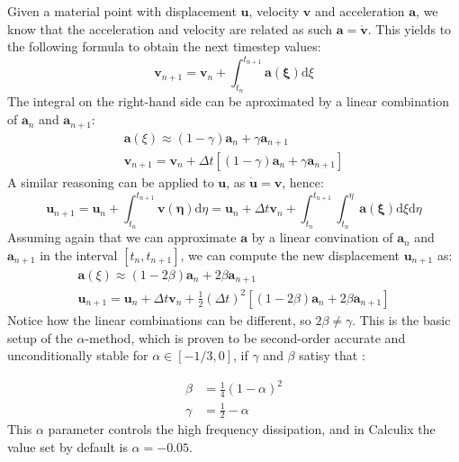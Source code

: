 \documentclass[
  english,        %
  font=times,     %
  onecolumn,      %
]{tumarticle}
\begin{document}
Given a material point with displacement $\boldsymbol{u}$, velocity $\boldsymbol{v}$ and acceleration $\boldsymbol{a}$, we know that the acceleration and velocity are related as such $\boldsymbol{a} = \dot{\boldsymbol{v}}$. This yields to the following formula to obtain the next timestep values:
\begin{equation}
    \boldsymbol{v}_{n+1} = \boldsymbol{v}_n + \int_{t_n}^{t_{n+1}} \boldsymbol{a(\xi)} \text{d}\xi
\end{equation}
The integral on the right-hand side can be aproximated by a linear combination of $ \boldsymbol{a}_n$ and $\boldsymbol{a}_{n+1}$:
\begin{gather}
    \boldsymbol{a}(\xi) \approx  (1 - \gamma) \boldsymbol{a}_n + \gamma \boldsymbol{a}_{n+1}\\
    \boldsymbol{v}_{n+1} = \boldsymbol{v}_n + \Delta t \left[ (1 - \gamma) \boldsymbol{a}_n + \gamma \boldsymbol{a}_{n+1} \right]
\end{gather} 
A similar reasoning can be applied to $\boldsymbol{u}$, as $\boldsymbol{\dot{u}} = \boldsymbol{v}$, hence:
\begin{equation}
    \boldsymbol{u}_{n+1} 
    = \boldsymbol{u}_n + \int_{t_n}^{t_{n+1}} \boldsymbol{v(\eta)}  \text{d}\eta 
    = \boldsymbol{u}_n + \Delta t \boldsymbol{v}_n + \int_{t_n}^{t_{n+1}} \int_{t_n}^{\eta} \boldsymbol{a(\xi)} \text{d}\xi \text{d}\eta 
\end{equation}
Assuming again that we can approximate $\boldsymbol{a}$ by a linear convination of $ \boldsymbol{a}_n$ and $\boldsymbol{a}_{n+1}$ in the interval $\left[ t_n, t_{n+1} \right]$, we can compute the new displacement $\boldsymbol{u}_{n+1}$ as:
\begin{gather}
    \boldsymbol{a}(\xi) \approx  (1 - 2\beta) \boldsymbol{a}_n + 2\beta \boldsymbol{a}_{n+1}\\
    \boldsymbol{u}_{n+1} = \boldsymbol{u}_n + \Delta t \boldsymbol{v}_n
    + \frac{1}{2} (\Delta t)^2 \left[ (1 - 2\beta) \boldsymbol{a}_n + 2\beta \boldsymbol{a}_{n+1} \right]
\end{gather} 
Notice how the linear combinations can be different, so $2\beta \neq \gamma$. This is the basic setup of the $\alpha$-method, which is proven to be second-order accurate and unconditionally stable for $\alpha \in [-1/3, 0]$, if $\gamma$ and $\beta$ satisy that \cite{dhondt2004finite}:

\begin{align}
    \beta &= \frac{1}{4}(1 - \alpha)^2 \\
    \gamma &= \frac{1}{2} - \alpha
\end{align}
This $\alpha$ parameter controls the high frequency dissipation, and in Calculix the value set by default is $\alpha=-0.05$.
\end{document}

